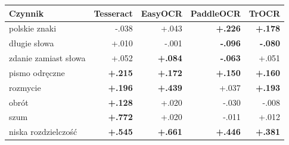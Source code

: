 \begin{tabular}{lrrrr}
\toprule
Czynnik & Tesseract & EasyOCR & PaddleOCR & TrOCR \\
\midrule
polskie znaki & -.038 & +.043 & \textbf{+.226} & \textbf{+.178} \\
długie słowa & +.010 & -.001 & \textbf{-.096} & \textbf{-.080} \\
zdanie zamiast słowa & +.052 & \textbf{+.084} & \textbf{-.063} & +.051 \\
pismo odręczne & \textbf{+.215} & \textbf{+.172} & \textbf{+.150} & \textbf{+.160} \\
rozmycie & \textbf{+.196} & \textbf{+.439} & +.037 & \textbf{+.193} \\
obrót & \textbf{+.128} & +.020 & -.030 & -.008 \\
szum & \textbf{+.772} & +.020 & -.011 & +.012 \\
niska rozdzielczość & \textbf{+.545} & \textbf{+.661} & \textbf{+.446} & \textbf{+.381} \\
\bottomrule
\end{tabular}
